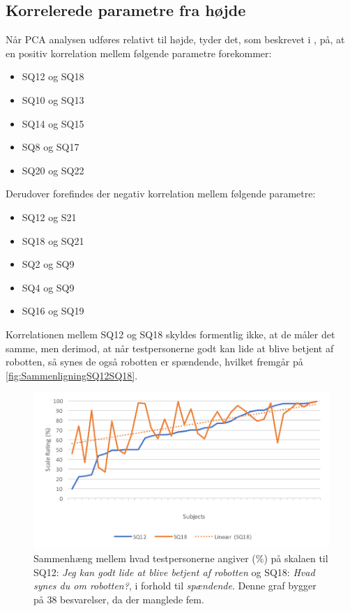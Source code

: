 \subsection{Korrelerede parametre fra højde}
\label{DatabehandlingSammenligningKorreleredeHoejde}
%
Når PCA analysen udføres relativt til højde, tyder det, som beskrevet i , på, at en positiv korrelation mellem følgende parametre forekommer:
%
\begin{itemize}
	\item SQ12 og SQ18
	\item SQ10 og SQ13 
	\item SQ14 og SQ15
	\item SQ8 og SQ17
	\item SQ20 og SQ22\blankline
\end{itemize}
\noindent
%
Derudover forefindes der negativ korrelation mellem følgende parametre:
%
\begin{itemize}
	\item SQ12 og S21
	\item SQ18 og SQ21
	\item SQ2 og SQ9
	\item SQ4 og SQ9
	\item SQ16 og SQ19\blankline
\end{itemize}
\noindent
%
Korrelationen mellem SQ12 og SQ18 skyldes formentlig ikke, at de måler det samme, men derimod, at når testpersonerne godt kan lide at blive betjent af robotten, så synes de også robotten er spændende, hvilket fremgår på \autoref{fig:SammenligningSQ12SQ18}. 
%
\begin{figure}[H]
	\centering
	\includegraphics[width=\textwidth]{Figure/Korrelationsgrafer/SQ12+SQ18}
	\caption{Sammenhæng mellem hvad testpersonerne angiver (\%) på skalaen til SQ12: \textit{Jeg kan godt lide at blive betjent af robotten} og SQ18: \textit{Hvad synes du om robotten?}, i forhold til \textit{spændende}. Denne graf bygger på 38 besvarelser, da der manglede fem.}
	\label{fig:SammenligningSQ12SQ18}
\end{figure}
